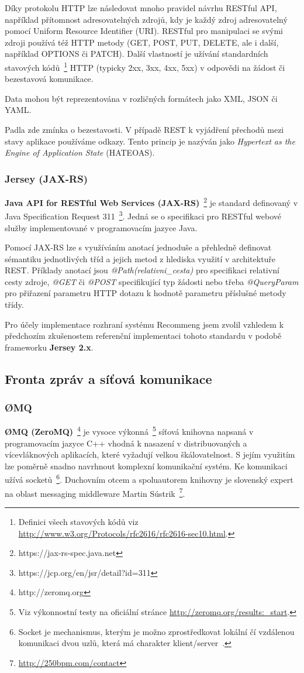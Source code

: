 \documentclass[thesis=M,czech]{FITthesis}[2014/05/07]
\begin{document}
Díky protokolu HTTP lze následovat mnoho pravidel návrhu RESTful API, například přítomnost adresovatelných zdrojů, kdy je každý zdroj adresovatelný pomocí Uniform Resource Identifier (URI). RESTful pro manipulaci se svými zdroji používá též HTTP metody (GET, POST, PUT, DELETE, ale i další, například OPTIONS či PATCH). Další vlastností je užívání standardních stavových kódů~\footnote{Definici všech stavových kódů viz \url{http://www.w3.org/Protocols/rfc2616/rfc2616-sec10.html}.} HTTP (typicky 2xx, 3xx, 4xx, 5xx) v odpovědi na žádost či bezestavová komunikace.

Data mohou být reprezentována v rozličných formátech jako XML, JSON či YAML.

Padla zde zmínka o bezestavosti. V případě REST k vyjádření přechodů mezi stavy aplikace používáme odkazy. Tento princip je nazýván jako \emph{Hypertext as the Engine of Application State} (HATEOAS). 

\subsubsection{Jersey (JAX-RS)}
\textbf{Java API for RESTful Web Services (JAX-RS)}~\footnote{https://jax-rs-spec.java.net} je standard definovaný v Java Specification Request 311~\footnote{https://jcp.org/en/jsr/detail?id=311}. Jedná se o specifikaci pro RESTful webové služby implementované v programovacím jazyce Java.

Pomocí JAX-RS lze s využíváním anotací jednoduše a přehledně definovat sémantiku jednotlivých tříd a jejich metod z hlediska využití v architektuře REST. Příklady anotací jsou \emph{@Path(relativni\_cesta)} pro specifikaci relativní cesty zdroje, \emph{@GET} či \emph{@POST} specifikující typ žádosti nebo třeba \emph{@QueryParam} pro přiřazení parametru HTTP dotazu k hodnotě parametru příslušné metody třídy.

Pro účely implementace rozhraní systému Recommeng jsem zvolil vzhledem k předchozím zkušenostem referenční implementaci tohoto standardu v podobě frameworku \textbf{Jersey 2.x}. 

\subsection{Fronta zpráv a síťová komunikace}

\subsubsection{ØMQ}
\textbf{ØMQ (ZeroMQ)}~\footnote{http://zeromq.org} je vysoce výkonná~\footnote{Viz výkonnostní testy na oficiální stránce \url{http://zeromq.org/results:_start}.} síťová knihovna napsaná v programovacím jazyce C++ vhodná k nasazení v distribuovaných a vícevláknových aplikacích, které vyžadují velkou škálovatelnost. S jejím využitím lze poměrně snadno navrhnout komplexní komunikační systém. Ke komunikaci užívá socketů~\footnote{Socket je mechanismus, kterým je možno zprostředkovat lokální čí vzdálenou komunikaci dvou uzlů, která má charakter klient/server~\cite{socket}.}. Duchovním otcem a spoluautorem knihovny je slovenský expert na oblast messaging middleware Martin Sústrik~\footnote{\url{http://250bpm.com/contact}}.
\end{document}
